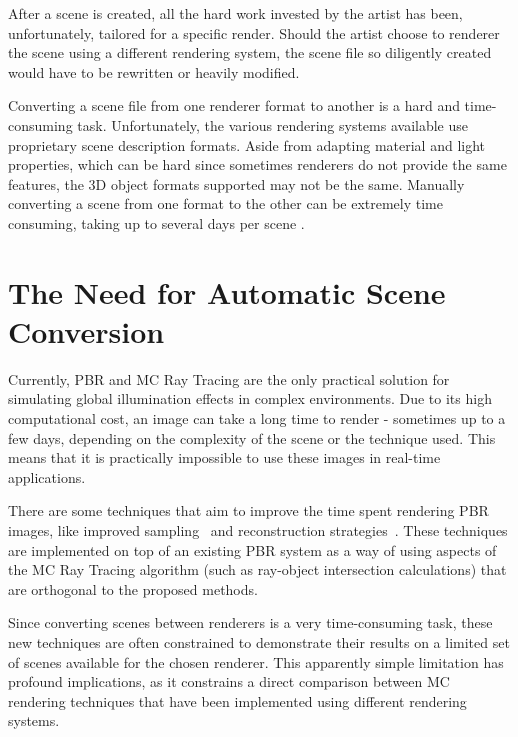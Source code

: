 After a scene is created, all the hard work invested by the artist has been, unfortunately, tailored for a specific render. 
Should the artist choose to renderer the scene using a different rendering system, the scene file so diligently created would have to be 
rewritten or heavily modified.

Converting a scene file from one renderer format to another is a hard and time-consuming task. Unfortunately, the various rendering systems available use proprietary scene description formats. Aside from adapting material and light properties, which can be hard since sometimes renderers do not provide the same features, the 3D object formats supported may not be the same. Manually converting a scene from one format to the other can be extremely time consuming, taking up to several days per scene \cite{tungsten}.


\section{The Need for Automatic Scene Conversion}

Currently, PBR and MC Ray Tracing are the only practical solution for simulating global illumination effects in complex environments. Due to its high computational cost, an image can take a long time to render - sometimes up to a few days, depending on the complexity of the scene or the technique used. This means that it is practically impossible to use these images in real-time applications.

There are some techniques that aim to improve the time spent rendering PBR images, like improved sampling~\cite{Heck2013, Pilleboue:2015} and reconstruction strategies~\cite{Sen2012, Rousselle2013, Kalantari2015, Bitterli2016}. These techniques are implemented on top of an existing PBR system as a way of using aspects of the MC Ray Tracing algorithm (such as ray-object intersection calculations) that are orthogonal to the proposed methods.

Since converting scenes between renderers is a very time-consuming task, these new techniques are often constrained to demonstrate their results on a limited set of scenes available for the chosen renderer. This apparently simple limitation has profound implications, as it constrains a direct comparison between MC rendering techniques that have been implemented using different rendering systems.

